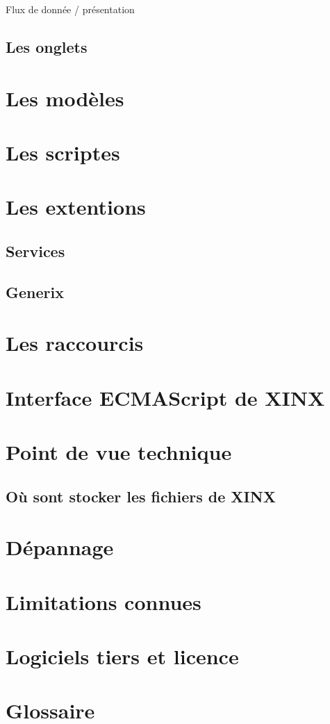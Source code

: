 \documentclass[a4paper,10pt,twoside]{book}
\begin{document}
Flux de donnée / présentation

\section{Les onglets}

\chapter{Les modèles}

\chapter{Les scriptes}
\label{sec:Scripts}

\chapter{Les extentions}

\section{Services}
\label{sec:Services}

\section{Generix}
\label{sec:Generix}

\appendix
\chapter{Les raccourcis}

\chapter{Interface ECMAScript de XINX}

\chapter{Point de vue technique}

\section{Où sont stocker les fichiers de XINX}

\chapter{Dépannage}

\chapter{Limitations connues}

\chapter{Logiciels tiers et licence}

\chapter{Glossaire}
\end{document}
